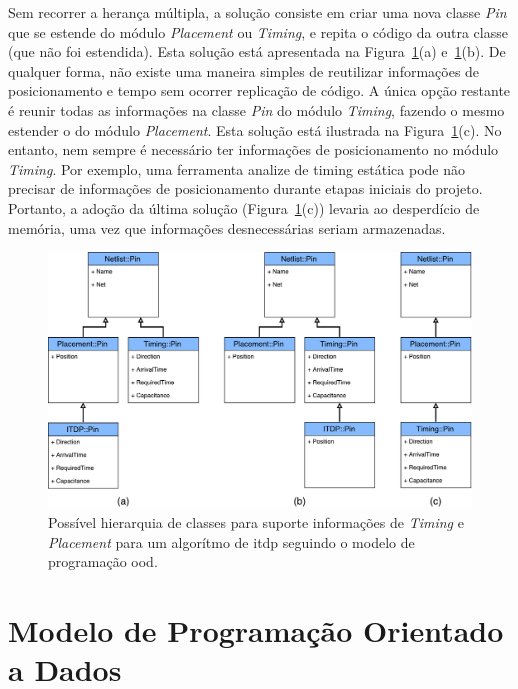 Sem recorrer a herança múltipla, a solução consiste em criar uma nova classe \textit{Pin} que se estende do módulo \textit{Placement} ou \textit{Timing}, e repita o código da outra classe (que não foi estendida).
Esta solução está apresentada na Figura~\ref{fig:classITDP}(a) e~\ref{fig:classITDP}(b).
De qualquer forma, não existe uma maneira simples de reutilizar informações de posicionamento e tempo sem ocorrer replicação de código.
A única opção restante é reunir todas as informações na classe \textit{Pin} do módulo \textit{Timing}, fazendo o mesmo estender o do módulo \textit{Placement}.
Esta solução está ilustrada na Figura~\ref{fig:classITDP}(c).
No entanto, nem sempre é necessário ter informações de posicionamento no módulo \textit{Timing}.
Por exemplo, uma ferramenta analize de timing estática pode não precisar de informações de posicionamento durante etapas iniciais do projeto.
Portanto, a adoção da última solução (Figura~\ref{fig:classITDP}(c)) levaria ao desperdício de memória, uma vez que informações desnecessárias seriam armazenadas.

\begin{figure}[!ht]
    \centering
    \includegraphics[width=\textwidth]{img/tecnica/ITDPsolutionOOD}
    \caption[Hierarquia de classes para suportar \textit{Timing} e \textit{Placement}]{Possível hierarquia de classes para suporte  informações de \textit{Timing} e \textit{Placement} para um algorítmo de \ac{itdp} seguindo o modelo de programação \ac{ood}.}
    \label{fig:classITDP}
\end{figure}

\section{Modelo de Programação Orientado a Dados}
\label{sec:modelo_orientado_dados}

